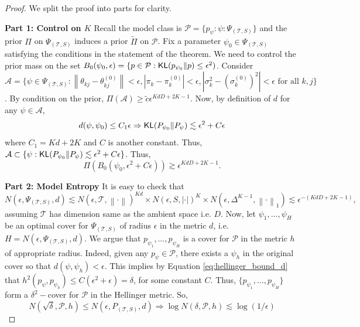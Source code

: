 \documentclass[bj,authoryear]{imsart}
\theoremstyle{plain}
\theoremstyle{remark}
\def\cA{\mathcal{A}}
\def\cP{\mathcal{P}}
\def\cT{\mathcal{T}}
\def\KL{{\sf KL}}
\def\norm#1{\left\|#1\right\|}
\begin{document}
\begin{appendix}
\begin{proof}
    We split the proof into parts for clarity.
    
\vspace{1em}
\textbf{Part 1: Control on $K$}
 Recall the model class is $\cP=\{p_{\psi}: \psi:\Psi_{(\cT,S)}\}$ and the prior $\Pi$ on $\Psi_{(\cT,S)}$ induces a prior $\tilde{\Pi}$ on $\cP$. Fix a parameter $\psi_0\in\Psi_{(\cT,S)}$ satisfying the conditions in the statement of the theorem. We need to control the prior mass on the set $B_0(\psi_0,\epsilon)=\{p\in \cP : \KL(p_{\psi_0}\Vert p)\leq \epsilon^2)$.
Consider $\cA = \{\psi\in \Psi_{(\cT,S)}: \norm{\theta_{kj}-\theta_{kj}^{(0)}}<\epsilon, |\pi_k - \pi_k^{(0)}|<\epsilon, |\sigma_k^2 - (\sigma_k^{(0)})^2|<\epsilon \text{ for all } k,j\}$. By condition on the prior, $\Pi(\cA)\geq \tilde{c}\epsilon^{KdD+2K-1}$. Now, by definition of $d$ for any $\psi\in \cA$,
$$d(\psi,\psi_0) \leq C_1 \epsilon \Rightarrow \KL(P_{\psi_0}\Vert P_{\psi}) \lesssim \epsilon^2 + C\epsilon$$
where $C_1=Kd+2K$ and $C$ is another constant. Thus, $\cA\subset \{\psi:\KL(P_{\psi_0}\Vert P_{\psi})\lesssim \epsilon^2 + C\epsilon\}$. Thus,
$$\Pi(B_0(\psi_0, \epsilon^2+C\epsilon)) \gtrsim \epsilon^{KdD+2K-1}.$$

\vspace{1em}
\textbf{Part 2: Model Entropy} It is easy to check that
$$N(\epsilon, \Psi_{(\cT,S)}, d) \lesssim N(\epsilon, \cT, \norm{\cdot})^{Kd}\times N(\epsilon,S, |\cdot|)^K\times N(\epsilon, \Delta^{K-1}, \norm{\cdot}_1) \lesssim \epsilon^{-(KdD + 2K-1)},$$
assuming $\cT$ has dimension same as the ambient space i.e. $D$. Now, let $\psi_1,\dots,\psi_H$ be an optimal cover for $\Psi_{(\cT,S)}$ of radius $\epsilon$ in the metric $d$, i.e. $H=N(\epsilon, \Psi_{(\cT,S)}, d)$. We argue that $p_{\psi_1},\dots,p_{\psi_H}$ is a cover for $\cP$ in the metric $h$ of appropriate radius. Indeed, given any $p_{\psi}\in \cP$, there exists a $\psi_h$ in the original cover so that $d(\psi,\psi_h)<\epsilon$. This implies by Equation \eqref{eq:hellinger_bound_d} that $h^2(p_{\psi}, p_{\psi_h}) \leq C(\epsilon^2 + \epsilon)=\delta$, for some constant $C$. Thus, $\{p_{\psi_1},\dots,p_{\psi_H}\}$ form a $\delta^2-$cover for $\cP$ in the Hellinger metric. So,
$$N(\sqrt{\delta}, \cP, h) \leq N(\epsilon, P_{(\cT,S)}, d) \Rightarrow \log N(\delta, \cP, h) \lesssim \log(1/\epsilon)$$


\end{proof}
\end{appendix}
\end{document}
